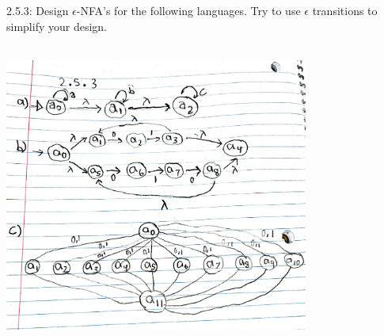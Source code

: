 \documentclass{article}
\theoremstyle{theorem}
\theoremstyle{definition}
\theoremstyle{remark}
\begin{document}
2.5.3: Design  $\epsilon$-NFA's for the following languages. Try to use $\epsilon$ transitions to simplify your design. 
\medskip\begin{center}
\includegraphics[width=10cm, height=10cm]{Week2_2.5.3.pdf}
\end{center}
\end{document}

